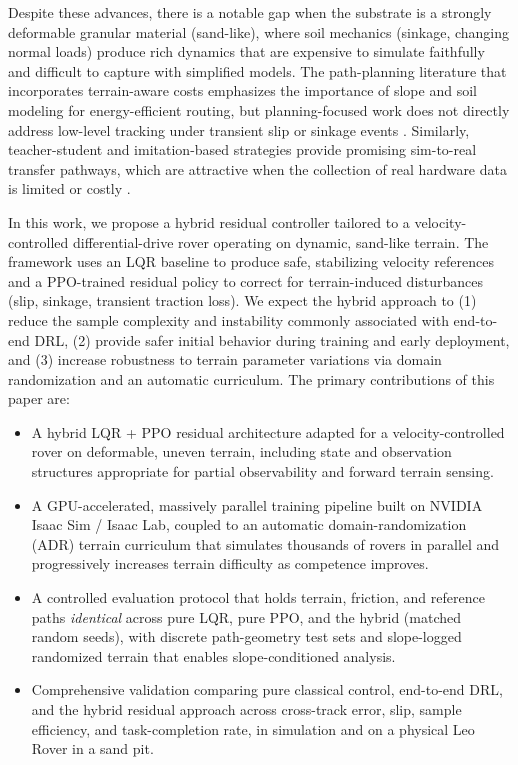 \documentclass[conference]{IEEEtran}
\begin{document}
Despite these advances, there is a notable gap when the substrate is a strongly deformable granular material (sand-like), where soil mechanics (sinkage, changing normal loads) produce rich dynamics that are expensive to simulate faithfully and difficult to capture with simplified models. The path-planning literature that incorporates terrain-aware costs emphasizes the importance of slope and soil modeling for energy-efficient routing, but planning-focused work does not directly address low-level tracking under transient slip or sinkage events \cite{yang2025dqnt, zhang2023energy}. Similarly, teacher-student and imitation-based strategies provide promising sim-to-real transfer pathways, which are attractive when the collection of real hardware data is limited or costly \cite{mortensen2023teacher, wang2025rov}.

In this work, we propose a hybrid residual controller tailored to a velocity-controlled differential-drive rover operating on dynamic, sand-like terrain. The framework uses an LQR baseline to produce safe, stabilizing velocity references and a PPO-trained residual policy to correct for terrain-induced disturbances (slip, sinkage, transient traction loss). We expect the hybrid approach to (1) reduce the sample complexity and instability commonly associated with end-to-end DRL, (2) provide safer initial behavior during training and early deployment, and (3) increase robustness to terrain parameter variations via domain randomization and an automatic curriculum. The primary contributions of this paper are:
\begin{itemize}
  \item A hybrid LQR + PPO residual architecture adapted for a velocity-controlled rover on deformable, uneven terrain, including state and observation structures appropriate for partial observability and forward terrain sensing.
  \item A GPU-accelerated, massively parallel training pipeline built on NVIDIA Isaac Sim / Isaac Lab, coupled to an automatic domain-randomization (ADR) terrain curriculum that simulates thousands of rovers in parallel and progressively increases terrain difficulty as competence improves.
  \item A controlled evaluation protocol that holds terrain, friction, and reference paths \emph{identical} across pure LQR, pure PPO, and the hybrid (matched random seeds), with discrete path-geometry test sets and slope-logged randomized terrain that enables slope-conditioned analysis.
  \item Comprehensive validation comparing pure classical control, end-to-end DRL, and the hybrid residual approach across cross-track error, slip, sample efficiency, and task-completion rate, in simulation and on a physical Leo Rover in a sand pit.
\end{itemize}
\end{document}
